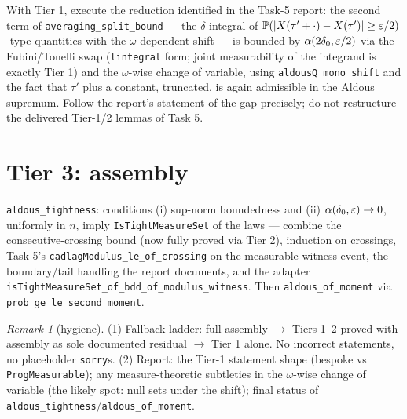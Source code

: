 \documentclass[11pt]{article}
\theoremstyle{plain}
\theoremstyle{remark}
\newtheorem{remark}{Remark}
\begin{document}
With Tier 1, execute the reduction identified in the Task-5 report: the
second term of \texttt{averaging\_split\_bound} --- the $\delta$-integral of
$\mathbb{P}(|X(\tau'+\cdot)-X(\tau')|\ge\varepsilon/2)$-type quantities with the
$\omega$-dependent shift --- is bounded by $\alpha(2\delta_0,\varepsilon/2)$ via the
Fubini/Tonelli swap (\texttt{lintegral} form; joint measurability of the
integrand is exactly Tier 1) and the $\omega$-wise change of variable, using
\texttt{aldousQ\_mono\_shift} and the fact that $\tau'$ plus a constant,
truncated, is again admissible in the Aldous supremum. Follow the report's
statement of the gap precisely; do not restructure the delivered Tier-1/2
lemmas of Task 5.

\section*{Tier 3: assembly}

\texttt{aldous\_tightness}: conditions (i) sup-norm boundedness and (ii)
$\alpha(\delta_0,\varepsilon)\to0$, uniformly in $n$, imply
\texttt{IsTightMeasureSet} of the laws --- combine the consecutive-crossing
bound (now fully proved via Tier 2), induction on crossings, Task 5's
\texttt{cadlagModulus\_le\_of\_crossing} on the measurable witness event, the
boundary/tail handling the report documents, and the adapter
\texttt{isTightMeasureSet\_of\_bdd\_of\_modulus\_witness}. Then
\texttt{aldous\_of\_moment} via \texttt{prob\_ge\_le\_second\_moment}.

\begin{remark}[hygiene]
(1) Fallback ladder: full assembly $\to$ Tiers 1--2 proved with assembly as
sole documented residual $\to$ Tier 1 alone. No incorrect statements, no
placeholder \texttt{sorry}s.
(2) Report: the Tier-1 statement shape (bespoke vs \texttt{ProgMeasurable});
any measure-theoretic subtleties in the $\omega$-wise change of variable
(the likely spot: null sets under the shift); final status of
\texttt{aldous\_tightness}/\texttt{aldous\_of\_moment}.
\end{remark}
\end{document}
